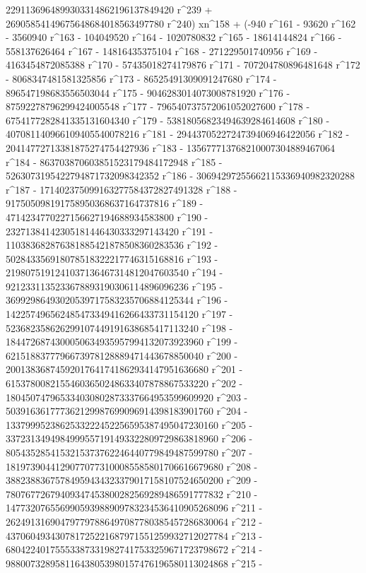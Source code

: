        2291136964899303314862196137849420 r^239 + 
       26905854149675648684018563497780 r^240) xn^158 + (-940 r^161 - 
       93620 r^162 - 3560940 r^163 - 104049520 r^164 - 
       1020780832 r^165 - 18614144824 r^166 - 558137626464 r^167 - 
       14816435375104 r^168 - 271229501740956 r^169 - 
       4163454872085388 r^170 - 57435018274179876 r^171 - 
       707204780896481648 r^172 - 8068347481581325856 r^173 - 
       86525491309091247680 r^174 - 896547198683556503044 r^175 - 
       9046283014073008781920 r^176 - 87592278796299424005548 r^177 - 
       796540737572061052027600 r^178 - 
       6754177282841335131604340 r^179 - 
       53818056823494639284614608 r^180 - 
       407081140966109405540078216 r^181 - 
       2944370522724739406946422056 r^182 - 
       20414772713381875274754427936 r^183 - 
       135677713768210007304889467064 r^184 - 
       863703870603851523179484172948 r^185 - 
       5263073195422794871732098342352 r^186 - 
       30694297255662115336940982320288 r^187 - 
       171402375099163277584372827491328 r^188 - 
       917505098191758950368637164737816 r^189 - 
       4714234770227156627194688934583800 r^190 - 
       23271384142305181446430333297143420 r^191 - 
       110383682876381885421878508360283536 r^192 - 
       502843356918078518322217746315168816 r^193 - 
       2198075191241037136467314812047603540 r^194 - 
       9212331135233678893190306114896096236 r^195 - 
       36992986493020539717583235706884125344 r^196 - 
       142257496562485473349416266433731154120 r^197 - 
       523682358626299107449191638685417113240 r^198 - 
       1844726874300050634935957994132073923960 r^199 - 
       6215188377796673978128889471443678850040 r^200 - 
       20013836874592017641741862934147951636680 r^201 - 
       61537800821554603650248633407878867533220 r^202 - 
       180450747965334030802873337664953599609920 r^203 - 
       503916361777362129987699096914398183901760 r^204 - 
       1337999523862533222452256595387495047230160 r^205 - 
       3372313494984999557191493322809729863818960 r^206 - 
       8054352854153215373762246440779849487599780 r^207 - 
       18197390441290770773100085585801706616679680 r^208 - 
       38823883675784959434323379017158107524650200 r^209 - 
       78076772679409347453800282569289486591777832 r^210 - 
       147732076556990593988909783234536410905268096 r^211 - 
       262491316904797797886497087780385457286830064 r^212 - 
       437060493430781725221687971551259932712027784 r^213 - 
       680422401755533873319827417533259671723798672 r^214 - 
       988007328958116438053980157476196580113024868 r^215 - 
